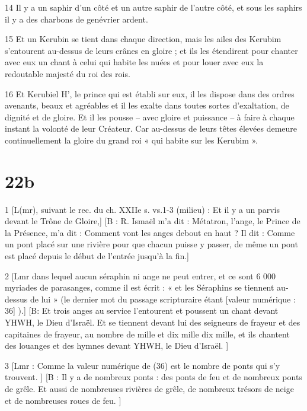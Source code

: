 \par 14 Il y a un saphir d'un côté et un autre saphir de l'autre côté, et sous les saphirs il y a des charbons de genévrier ardent.

\par 15 Et un Kerubin se tient dans chaque direction, mais les ailes des Kerubim s'entourent au-dessus de leurs crânes en gloire ; et ils les étendirent pour chanter avec eux un chant à celui qui habite les nuées et pour louer avec eux la redoutable majesté du roi des rois.

\par 16 Et Kerubiel H', le prince qui est établi sur eux, il les dispose dans des ordres avenants, beaux et agréables et il les exalte dans toutes sortes d'exaltation, de dignité et de gloire. Et il les pousse – avec gloire et puissance – à faire à chaque instant la volonté de leur Créateur. Car au-dessus de leurs têtes élevées demeure continuellement la gloire du grand roi « qui habite sur les Kerubim ».

\chapter{22b}

\par 1 [L(mr), suivant le rec. du ch. XXIIe s. vs.1-3 (milieu) : Et il y a un parvis devant le Trône de Gloire,] [B : R. Ismaël m'a dit : Métatron, l'ange, le Prince de la Présence, m'a dit : Comment vont les anges debout en haut ? Il dit : Comme un pont placé sur une rivière pour que chacun puisse y passer, de même un pont est placé depuis le début de l'entrée jusqu'à la fin.]

\par 2 [Lmr dans lequel aucun séraphin ni ange ne peut entrer, et ce sont 6 000 myriades de parasanges, comme il est écrit : « et les Séraphins se tiennent au-dessus de lui » (le dernier mot du passage scripturaire étant [valeur numérique : 36] ).] [B: Et trois anges au service l'entourent et poussent un chant devant YHWH, le Dieu d'Israël. Et se tiennent devant lui des seigneurs de frayeur et des capitaines de frayeur, au nombre de mille et dix mille dix mille, et ils chantent des louanges et des hymnes devant YHWH, le Dieu d'Israël. ]

\par 3 [Lmr : Comme la valeur numérique de (36) est le nombre de ponts qui s'y trouvent. ] [B : Il y a de nombreux ponts : des ponts de feu et de nombreux ponts de grêle. Et aussi de nombreuses rivières de grêle, de nombreux trésors de neige et de nombreuses roues de feu. ]

